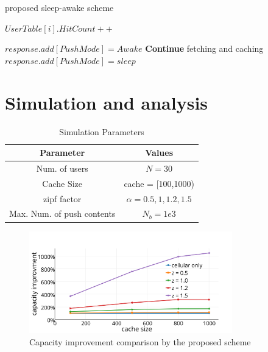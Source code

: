 \documentclass[conference]{IEEEtran}
\begin{document}
\begin{algorithm}[!ht]
\caption{proposed sleep-awake scheme}
\label{alg:sa}
\begin{algorithmic}[1]
 {}
	\State $UserTable[i].HitCount ++$
	\EndIf
	
       \State $response.add[PushMode] = Awake$
       	\State \textbf{Continue}
       \Else
        \State fetching and caching
        \EndIf
       \EndFor
       \Else
       \State $response.add[PushMode] = sleep$
        
    \EndIf
   

\EndFor
\EndProcedure
\end{algorithmic}
\end{algorithm}


\section{Simulation and analysis}

\begin{table}[hbt]
\footnotesize
\renewcommand\arraystretch{1}
\begin{center}
\caption{\label{Table2}Simulation Parameters}
\begin{tabular}{c|c}
\toprule
\hline
 Parameter  &    Values \\
  \hline
 Num. of users  & $N=30$ \\
   Cache Size &cache = [100,1000)   \\
  zipf factor & $\alpha=0.5,1,1.2,1.5 $   \\
    Max. Num. of push contents &   $N_b=1e3$  \\
    \hline
\bottomrule
\end{tabular}
\end{center}
\end{table}



\begin{figure}[!h]
\centering
\includegraphics[width=8.8cm]{figure/capacity-new.png}
 \caption{Capacity improvement comparison by the proposed scheme}
\label{Fig.4}
\end{figure}
\end{document}
